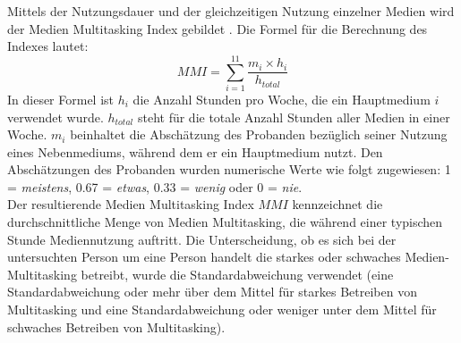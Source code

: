 Mittels der Nutzungsdauer und der gleichzeitigen Nutzung einzelner Medien wird der Medien Multitasking Index gebildet    . Die Formel für die Berechnung des Indexes lautet:
\begin{equation}\label{formula.mmi}
    MMI=\sum_{i=1}^{11} \frac{m_{i} \times h_{i}}{h_{total}}
\end{equation}
In dieser Formel ist \(h_{i}\) die Anzahl Stunden pro Woche, die ein Hauptmedium \(i\) verwendet wurde. \(h_{total}\) steht für die totale Anzahl Stunden aller Medien in einer Woche. \(m_i\) beinhaltet die Abschätzung des Probanden bezüglich seiner Nutzung eines Nebenmediums, während dem er ein Hauptmedium nutzt. Den Abschätzungen des Probanden wurden numerische Werte wie folgt zugewiesen: 1 = \textit{meistens}, 0.67 = \textit{etwas}, 0.33 = \textit{wenig} oder 0 = \textit{nie}. \\
Der resultierende Medien Multitasking Index \(MMI\) kennzeichnet die durchschnittliche Menge von Medien Multitasking, die während einer typischen Stunde Mediennutzung auftritt. Die Unterscheidung, ob es sich bei der untersuchten Person um eine Person handelt die starkes oder schwaches Medien-Multitasking betreibt, wurde die Standardabweichung verwendet (eine Standardabweichung oder mehr über dem Mittel für starkes Betreiben von Multitasking und eine Standardabweichung oder weniger unter dem Mittel für schwaches Betreiben von Multitasking). 

